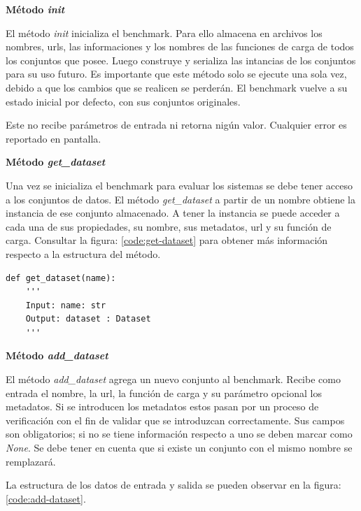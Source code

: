\begin{flushleft} 
    { \textbf{ Método \textit{init}}}\label{method:create}
\end{flushleft}
El método \textit{init} inicializa el benchmark. Para ello almacena en archivos los nombres, urls, las informaciones y los nombres de las funciones de carga de todos 
los conjuntos que posee. 
Luego construye y serializa las intancias de los conjuntos para su uso futuro. Es importante que este método solo se ejecute una sola vez, debido a que los cambios 
que se realicen se perderán. El benchmark vuelve a su estado inicial por defecto, con sus conjuntos originales.

Este no recibe parámetros de entrada ni retorna nigún valor. Cualquier error es reportado en pantalla.

\begin{flushleft} 
    { \textbf{Método \textit{get\_dataset}}}\label{method:get-dataset}
\end{flushleft}

Una vez se inicializa el benchmark para evaluar los sistemas se debe tener acceso a los conjuntos de datos.
El método \textit{get\_dataset} a partir de un nombre obtiene la instancia de ese conjunto almacenado.
A tener la instancia se puede acceder a cada una de sus propiedades, su nombre, sus metadatos, url y su 
función de carga.  
Consultar la figura: \ref{code:get-dataset} para obtener más información respecto a la estructura del método. 



\begin{lstlisting}[caption= Método init,label = code:get-dataset]
def get_dataset(name):
    '''
    Input: name: str 
    Output: dataset : Dataset
    ''' 
\end{lstlisting}
  
\begin{flushleft} 
    { \textbf{Método \textit{add\_dataset} }}\label{method:new}
\end{flushleft}
El método \textit{add\_dataset} agrega un nuevo conjunto al benchmark. 
Recibe como entrada el nombre, la url, la función de carga y su parámetro opcional los metadatos.
Si se introducen los metadatos estos pasan por un proceso de verificación con el fin de validar que se introduzcan correctamente.
Sus campos son obligatorios; si no se tiene información respecto a uno se deben marcar como \textit{None}.
Se debe tener en cuenta que si existe un conjunto con el mismo nombre se remplazará.

La estructura de los datos de entrada y salida se pueden observar en la figura:\ref{code:add-dataset}. 

